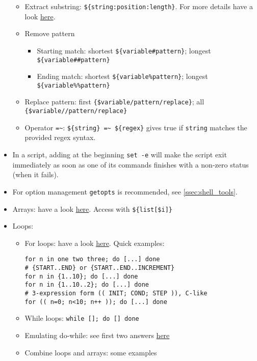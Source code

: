 \documentclass[a4paper,12pt,%
              final%
              ]{article}
\begin{document}
\begin{itemize}
\begin{itemize}
      \item Extract substring: \verb|${string:position:length}|. For more details have a look \href{https://stackoverflow.com/questions/1405611/how-to-extract-the-first-two-characters-of-a-string-in-shell-scripting}{here}.
      \item Remove pattern
        \begin{itemize}
          \item Starting match: shortest \verb|${variable#pattern}|; longest \verb|${variable##pattern}|
          \item Ending match: shortest \verb|${variable%pattern}|; longest \verb|${variable%%pattern}|
        \end{itemize}
      \item Replace pattern: first \verb|{$variable/pattern/replace}|; all \verb|{$variable//pattern/replace}|
      \item Operator \verb|=~|: \verb|${string} =~ ${regex}| gives true if \verb|string| matches the provided regex syntax.
    \end{itemize}
  \item In a script, adding at the beginning \verb|set -e| will make the script exit immediately as soon as one of its commands finishes with a non-zero status (when it fails).
  \item For option management \verb|getopts| is recommended, see \autoref{ssec:shell_tools}.
  \item Arrays: have a look \href{https://opensource.com/article/18/5/you-dont-know-bash-intro-bash-arrays}{here}. Access with \verb|${list[$i]}|
  \item Loops:
    \begin{itemize}
      \item For loops: have a look \href{https://www.cyberciti.biz/faq/bash-for-loop/}{here}. Quick examples:
\begin{verbatim}
for n in one two three; do [...] done
# {START..END} or {START..END..INCREMENT}
for n in {1..10}; do [...] done
for n in {1..10..2}; do [...] done
# 3-expression form (( INIT; COND; STEP )), C-like
for (( n=0; n<10; n++ )); do [...] done
\end{verbatim}
      \item While loops: \verb|while []; do [] done|
      \item Emulating do-while: see first two answers \href{https://stackoverflow.com/questions/16489809/emulating-a-do-while-loop-in-bash}{here}
      \item Combine loops and arrays: some examples

\end{itemize}
\end{itemize}
\end{document}

